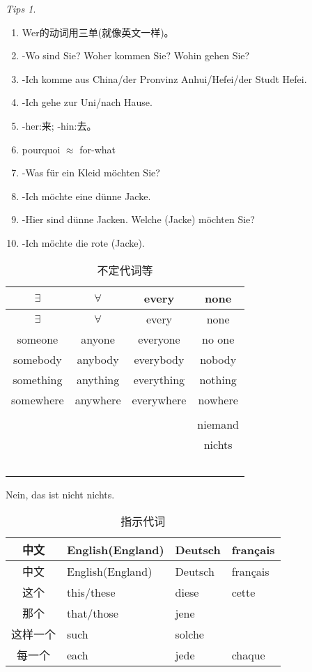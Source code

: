 \documentclass[12pt,A4paper,oneside,reqno]{amsart}
\numberwithin{equation}{section}
\theoremstyle{plain}
\theoremstyle{plain}
\theoremstyle{plain}
\numberwithin{equation}{section}
\theoremstyle{remark}
\newtheorem{tips}[theorem]{Tips}
\begin{document}
\begin{tips}\
	\begin{enumerate}[1.]
		\item Wer的动词用三单(就像英文一样)。
		\item -Wo sind Sie? Woher kommen Sie? Wohin gehen Sie?
		\item []-Ich komme aus China/der Pronvinz Anhui/Hefei/der Studt Hefei.
		\item []-Ich gehe zur Uni/nach Hause.
		\item []-her:来; -hin:去。
		\item pourquoi $\approx$ for-what
		\item -Was f\"{u}r ein Kleid m\"{o}chten Sie?
		\item []-Ich m\"{o}chte eine d\"{u}nne Jacke.
		\item []-Hier sind d\"{u}nne Jacken. Welche (Jacke) m\"{o}chten Sie?
		\item []-Ich m\"{o}chte die rote (Jacke).
	\end{enumerate}
\end{tips}
\begin{longtable}{c|c|c|c}
	\hline
	$\exists$	&	$\forall$	&	every & none	\\
	\hline
	\endhead
	\hline
	$\exists$	&	$\forall$	&	every & none	\\
	\hline
	\endfirsthead	
	\hline
	\endfoot
	\hline		
	\caption{不定代词等}
	\endlastfoot								
someone	&	anyone	&	everyone	&	no one	\\
somebody	&	anybody	&	everybody	&	nobody	\\
something	&	anything	&	everything	&	nothing	\\
somewhere	&	anywhere	&	everywhere	&	nowhere	\\
\hline							
&		&		&		\\
&		&		&	niemand	\\
&		&		&	nichts	\\
&		&		&		\\
\hline							
&		&		&		\\
&		&		&		\\
&		&		&		\\
&		&		&		\\

	
	
	
	
	
	\hline
\end{longtable}
Nein, das ist nicht nichts.
\begin{longtable}{c|l|l|l}
	\hline
	中文	&	English(England)	&	Deutsch	&	français	\\
	\hline
	\endhead
	\hline
	中文	&	English(England)	&	Deutsch	&	français	\\
	\hline
	\endfirsthead	
	\hline
	\endfoot
	\hline	
	\caption{指示代词}
	\endlastfoot				
这个	&	this/these	&	diese	&	cette	\\
那个	&	that/those	&	jene	&		\\
这样一个	&	such	&	solche	&		\\
每一个	&	each	&	jede	&	chaque	\\

	
	
\end{longtable}
\newpage
\end{document}
